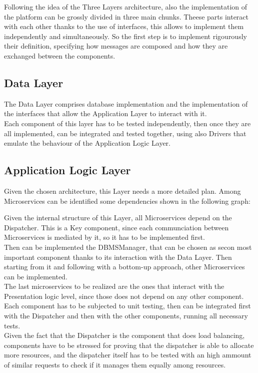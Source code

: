Following the idea of the Three Layers architecture, also the implementation of the platform can be grossly divided in three main chunks.
Theese parts interact with each other thanks to the use of interfaces, this allows to implement them independently and simultaneously. So the first step is to implement rigourously their definition, specifying how messages are composed and how they are exchanged between the components.\\

\subsection{Data Layer}
The Data Layer comprises database implementation and the implementation of the interfaces that allow the Application Layer to interact with it.\\
Each component of this layer has to be tested independently, then once they are all implemented, can be integrated and tested together, using also Drivers that emulate the behaviour of the Application Logic Layer.\\
\subsection{Application Logic Layer}
Given the chosen architecture, this Layer needs a more detailed plan. Among Microservices can be identified some dependencies shown in the following graph:


Given the internal structure of this Layer, all Microservices depend on the Dispatcher. This is a Key component, since each communciation between Microservices is mediated by it, so it has to be implemented first.\\
Then can be implemented the DBMSManager, that can be chosen as secon most important component thanks to its interaction with the Data Layer. Then starting from it and following with a bottom-up approach, other Microservices can be implemented.\\
The last microservices to be realized are the ones that interact with the Presentation logic level, since those does not depend on any other component.\\
Each component has to be subjected to unit testing, then can be integrated first with the Dispatcher and then with the other components, running all necessary tests.\\
Given the fact that the Dispatcher is the component that does load balancing, components have to be stressed for proving that the dispatcher is able to allocate more resources, and the dispatcher itself has to be tested with an high ammount of similar requests to check if it manages them equally among resources.\\

